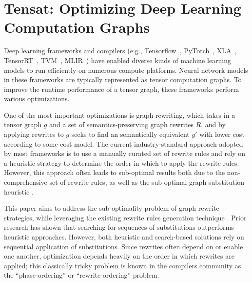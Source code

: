 \section{Tensat: Optimizing Deep Learning Computation Graphs}
\label{sec:tensat}

\newcommand{\ourname}{Tensat}

Deep learning frameworks and compilers
 (e.g., Tensorflow~\cite{TensorFlow}, PyTorch~\cite{NEURIPS2019_9015},
  XLA~\cite{xla}, TensorRT~\cite{TensorRT}, TVM~\cite{TVM},
  MLIR~\cite{mlir})
 have enabled diverse kinds of machine learning models to run
 efficiently on numerous compute platforms.
Neural network models in
 these frameworks are typically represented as tensor computation
 graphs.
To improve the runtime performance of a tensor graph, these
 frameworks perform various optimizations.

One of the most important optimizations is graph rewriting,
 which takes in a tensor graph $g$ and a set of semantics-preserving graph rewrites $R$,
 and by applying rewrites to $g$ seeks to find an semantically equivalent $g'$ with lower cost according to some cost model.
The current industry-standard approach adopted by most frameworks is to use a manually curated set of rewrite rules and rely on a heuristic strategy to determine the order in which to apply the rewrite rules.
However, this approach often leads to sub-optimal results both due to the non-comprehensive set of rewrite rules, as well as the sub-optimal graph substitution heuristic \cite{taso,metaflow}. %

This paper aims to address the sub-optimality problem of graph rewrite strategies, while leveraging the existing rewrite rules generation technique \cite{taso}.
Prior research has shown that searching for sequences of substitutions
\cite{taso,metaflow,Fang:sampling} outperforms heuristic approaches.
However, both heuristic and search-based solutions rely on sequential application of substitutions.
Since rewrites often depend on or enable one another,
optimization depends heavily on the order in which rewrites are applied;
this classically tricky problem is known in the compilers community as the ``phase-ordering'' or ``rewrite-ordering'' problem.


